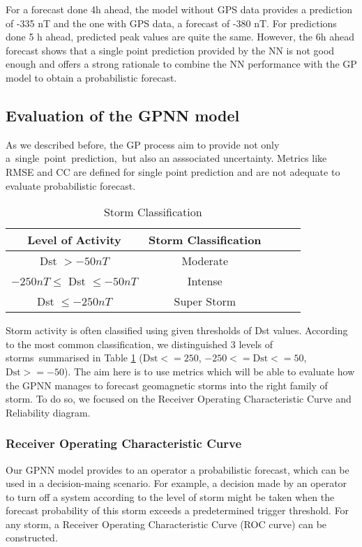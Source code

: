 For a forecast done 4h ahead, the model without GPS data 
provides a prediction of -335 nT and the one with GPS data, a forecast of -380 nT. For predictions done 5 h ahead, 
predicted peak values are quite the same. However, the 6h ahead forecast shows that a single point prediction 
provided by the NN is not good enough and offers a strong rationale to combine the NN performance with the 
GP model to obtain a probabilistic forecast. 


\subsection{Evaluation of the GPNN model}

As we described before, the GP process aim to provide not only a\ single\ point\ prediction,\ 
but also an asssociated  uncertainty. Metrics like RMSE and CC are defined for single point prediction 
and  are not adequate  to evaluate  probabilistic forecast.

\begin{table}[h]
	\centering
	\caption{Storm Classification}
	\label{table:stormclass}
	\begin{tabular}{ccccc}
	\hline
	Level of Activity & Storm Classification \\ \hline
	Dst $> -50 nT$ & Moderate\\
	$-250 nT \leq $ Dst $\leq -50 nT$ & Intense\\
	Dst $\leq -250 nT$ & Super Storm\\ \hline
	\end{tabular}
\end{table}

Storm activity is often classified using given thresholds of Dst values. According to the most common 
classification, we distinguished 3 levels of storms summarised in Table \ref{table:stormclass} 
($\text{Dst} <= 250$, $-250 <= \text{Dst} <= 50$, $\text{Dst} >= -50$). The aim here is to use metrics 
which will be able to evaluate how the GPNN manages to forecast geomagnetic storms into the 
right family of storm. To do so, we focused on the Receiver Operating Characteristic Curve and 
Reliability diagram.



\subsubsection{Receiver Operating Characteristic Curve}


Our GPNN model provides to an operator a probabilistic forecast, which can be used in a decision-maing scenario. 
For example, a decision made by an operator to turn off a system according to the level of storm might be taken 
when the forecast probability of this storm exceeds a predetermined trigger threshold. For any storm, 
a Receiver Operating Characteristic Curve (ROC curve) can be constructed. 

